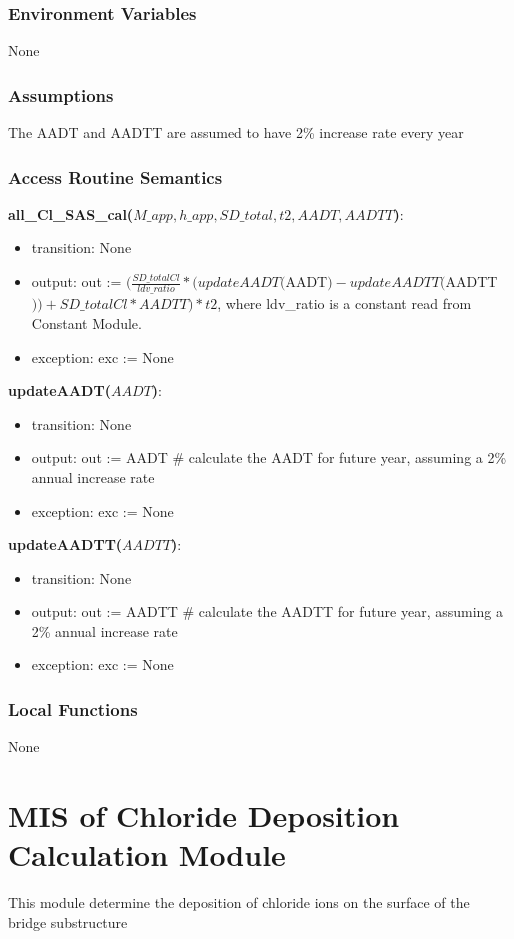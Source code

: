 \documentclass[12pt, titlepage]{article}
\begin{document}
\subsubsection{Environment Variables}
None
\subsubsection{Assumptions}
The AADT and AADTT are assumed to have 2\% increase rate every year
\subsubsection{Access Routine Semantics}

\noindent \textbf{all\_Cl\_SAS\_cal($M\_app, h\_app, SD\_total, t2, AADT, AADTT$)}:
\begin{itemize}
\item transition: None
\item output: out := $(\frac{SD\_totalCl}{ldv\_ratio}*(updateAADT($AADT$)-updateAADTT($AADTT$))+ SD\_totalCl* AADTT) * t2$, where ldv\_ratio is a constant read from Constant Module.
\item exception: exc := None
\end{itemize}
\noindent \textbf{updateAADT($AADT$)}:
\begin{itemize}
\item transition: None
\item output: out := AADT \# calculate the AADT for future year, assuming a 2\% annual increase rate 
\item exception: exc := None
\end{itemize}
\noindent \textbf{updateAADTT($AADTT$)}:
\begin{itemize}
\item transition: None
\item output: out := AADTT \# calculate the AADTT for future year, assuming a 2\% annual increase rate 
\item exception: exc := None
\end{itemize}


\subsubsection{Local Functions}
None

\newpage


\section{MIS of Chloride Deposition Calculation Module} \label{chlorideDepositionCalculation Module}
This module determine the deposition of chloride ions on the surface of the bridge substructure
\end{document}
